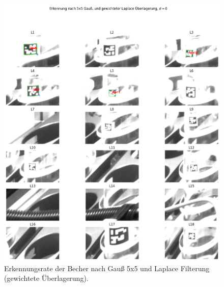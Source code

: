     \begin{figure}
        \caption[Erkennungsrate der Becher mit Gauß 5x5 und Laplace Filter]{\small Erkennungsrate der Becher nach Gauß 5x5 und Laplace Filterung (gewichtete Überlagerung).}\label{fig:figure25}
        \includegraphics[width = \textwidth]{Bilder/ErkennungsrateGausLaplace.png}
        \centering
    \end{figure}

